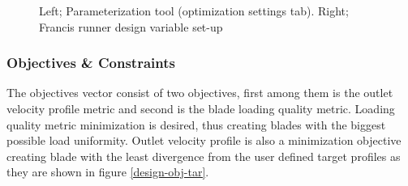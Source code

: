 \begin{figure}[h!]
\begin{minipage}[b]{0.5\linewidth}
 \centering
\end{minipage}
\begin{minipage}[b]{0.5\linewidth}
 \centering
\end{minipage}
\caption{Left; Parameterization tool (optimization settings tab). Right; Francis runner design variable set-up}
\label{design-parameterization2}
\end{figure}

\subsubsection{Objectives \& Constraints}
The objectives vector consist of two objectives, first among them is the outlet velocity profile metric and second is the blade loading quality metric. Loading quality metric minimization is desired, thus creating blades with the biggest possible load uniformity. Outlet velocity profile is also a minimization objective creating blade with the least divergence from the user defined target profiles as they are shown in figure \ref{design-obj-tar}. 

